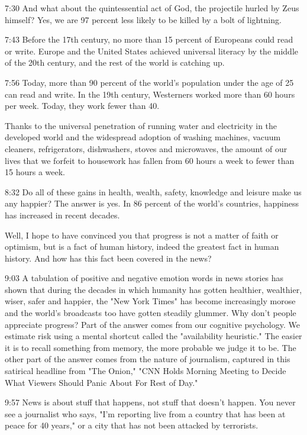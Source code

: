 \documentclass[10pt,titlepage]{article}
\begin{document}
7:30
And what about the quintessential act of God,
the projectile hurled by Zeus himself?
Yes, we are 97 percent less likely to be killed by a bolt of lightning.

7:43
Before the 17th century,
no more than 15 percent of Europeans could read or write.
Europe and the United States achieved universal literacy
by the middle of the 20th century,
and the rest of the world is catching up.

7:56
Today, more than 90 percent of the world's population
under the age of 25 can read and write.
In the 19th century, Westerners worked more than 60 hours per week.
Today, they work fewer than 40.

Thanks to the universal penetration of running water and electricity
in the developed world
and the widespread adoption of washing machines, vacuum cleaners,
refrigerators, dishwashers, stoves and microwaves,
the amount of our lives that we forfeit to housework
has fallen from 60 hours a week
to fewer than 15 hours a week.

8:32
Do all of these gains in health, wealth, safety, knowledge and leisure
make us any happier?
The answer is yes.
In 86 percent of the world's countries,
happiness has increased in recent decades.

Well, I hope to have convinced you
that progress is not a matter of faith or optimism,
but is a fact of human history,
indeed the greatest fact in human history.
And how has this fact been covered in the news?

9:03
A tabulation of positive and negative emotion words in news stories
has shown that during the decades in which humanity has gotten healthier,
wealthier, wiser, safer and happier,
the "New York Times" has become increasingly morose
and the world's broadcasts too have gotten steadily glummer.
Why don't people appreciate progress?
Part of the answer comes from our cognitive psychology.
We estimate risk using a mental shortcut called the "availability heuristic."
The easier it is to recall something from memory,
the more probable we judge it to be.
The other part of the answer comes from the nature of journalism,
captured in this satirical headline from "The Onion,"
"CNN Holds Morning Meeting to Decide
What Viewers Should Panic About For Rest of Day."

9:57
News is about stuff that happens, not stuff that doesn't happen.
You never see a journalist who says,
"I'm reporting live from a country that has been at peace for 40 years,"
or a city that has not been attacked by terrorists.
\end{document}
